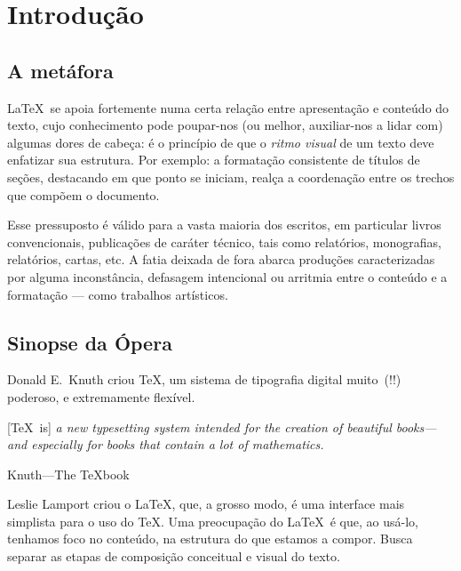 \section{Introdução}



\subsection{A metáfora}

\LaTeX\ se apoia fortemente numa certa relação entre apresentação e
conteúdo do texto, cujo
conhecimento pode poupar-nos (ou melhor, auxiliar-nos a lidar com)
algumas dores de cabeça: é o princípio de que o \emph{ritmo visual} de
um texto deve enfatizar sua estrutura. Por exemplo: a formatação
consistente de títulos de seções, destacando em que ponto se iniciam,
realça a coordenação entre os trechos que compõem o documento.

Esse pressuposto é válido para a vasta maioria dos escritos, em
particular livros convencionais, publicações de caráter técnico,
tais como relatórios, monografias,  relatórios, cartas, etc. A fatia
deixada de fora abarca produções caracterizadas por alguma
inconstância, defasagem intencional ou arritmia entre o conteúdo e a
formatação --- como trabalhos artísticos.

\subsection{Sinopse da Ópera}

Donald E.~Knuth criou \TeX, um sistema de tipografia digital muito~(!!)
poderoso, e extremamente flexível.

\begin{center}
\begin{minipage}{.75\textwidth}
  [\TeX\ is] \textit{a new typesetting system intended for the creation of
  beautiful books---and especially for books that contain a lot of
  mathematics.}

  \hfill Knuth---The \TeX book
\end{minipage}
\end{center}

  
Leslie Lamport criou o \LaTeX, que, a grosso modo, é uma interface
mais simplista para o uso do \TeX. Uma preocupação do \LaTeX\ é que,
ao usá-lo, tenhamos foco no conteúdo, na estrutura do que estamos a
compor. Busca separar as etapas de composição conceitual e visual do
texto.

